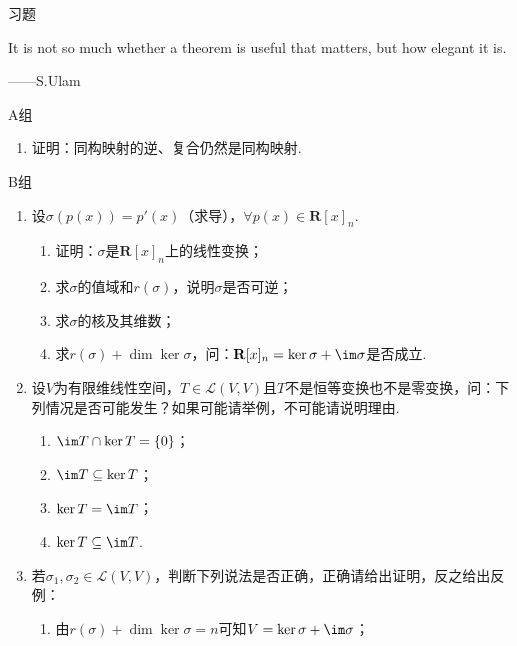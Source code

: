\vspace{2ex}
\centerline{\heiti \Large 习题}

\vspace{2ex}
It is not so much whether a theorem is useful that matters, but how elegant it is.
\begin{flushright}
    ——S.Ulam
\end{flushright}

\centerline{\heiti A组}
\begin{enumerate}
    \item 证明：同构映射的逆、复合仍然是同构映射.
\end{enumerate}

\centerline{\heiti B组}
\begin{enumerate}
    \item 设$\sigma(p(x))=p'(x)$（求导），$\forall p(x) \in \mathbf{R}[x]_n$.
          \begin{enumerate}
              \item 证明：$\sigma$是$\mathbf{R}[x]_n$上的线性变换；

              \item 求$\sigma$的值域和$r(\sigma)$，说明$\sigma$是否可逆；

              \item 求$\sigma$的核及其维数；

              \item 求$r(\sigma)+\dim\ker\sigma$，问：$\mathbf{R}[x]_n=\ker\sigma+\im \sigma$是否成立.
          \end{enumerate}

    \item 设$V$为有限维线性空间，$T\in \mathcal{L}(V,V)$且$T$不是恒等变换也不是零变换，问：下列情况是否可能发生？如果可能请举例，不可能请说明理由.
          \begin{enumerate}
              \item $\im T \cap \ker T = \{0\}$；

              \item $\im T \subseteq \ker T$；

              \item $\ker T = \im T$；

              \item $\ker T \subseteq \im T$.
          \end{enumerate}

    \item 若$\sigma_1,\sigma_2\in \mathcal{L}(V,V)$，判断下列说法是否正确，正确请给出证明，反之给出反例：
          \begin{enumerate}
              \item 由$r(\sigma)+\dim\ker\sigma=n$可知$V=\ker\sigma+\im \sigma$；


\end{enumerate}
\end{enumerate}
